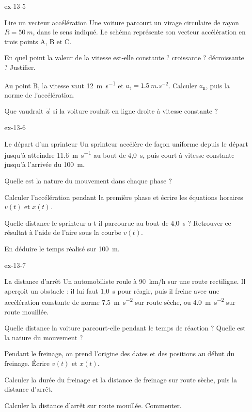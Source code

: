 \begin{blocLivre}{ex-13-5}
\begin{exercice}[1]{Lire un vecteur accélération}
Une voiture parcourt un virage circulaire de rayon $R=\qty{50}{m}$, dans le sens indiqué. Le schéma représente son
vecteur accélération en trois points A, B et C.
\begin{questions}
\item En quel point la valeur de la vitesse est-elle constante ? croissante ? décroissante ? Justifier.
\item Au point B, la vitesse vaut \qty{12}{m.s^{-1}} et $a_\mathrm{t}=\qty{1,5}{m.s^{-2}}$. Calculer $a_\mathrm{n}$, puis la norme
de l'accélération.
\item Que vaudrait $\vec{a}$ si la voiture roulait en ligne droite à vitesse constante ?
\end{questions}
\end{exercice}
\end{blocLivre}
\begin{blocLivre}{ex-13-6}
\begin{exercice}[2]{Le départ d'un sprinteur}
Un sprinteur accélère de façon uniforme depuis le départ jusqu'à atteindre \qty{11,6}{m.s^{-1}} au bout de 4,0~s, puis
court à vitesse constante jusqu'à l'arrivée du 100~m.
\begin{questions}
\item Quelle est la nature du mouvement dans chaque phase ?
\item Calculer l'accélération pendant la première phase et écrire les équations horaires $v(t)$ et $x(t)$.
\item Quelle distance le sprinteur a-t-il parcourue au bout de 4,0~s ? Retrouver ce résultat à l'aide de l'aire sous la
courbe $v(t)$.
\item En déduire le temps réalisé sur 100~m.
\end{questions}
\end{exercice}
\end{blocLivre}
\begin{blocLivre}{ex-13-7}
\begin{exercice}[2]{La distance d'arrêt}
Un automobiliste roule à 90~km/h sur une route rectiligne. Il aperçoit un obstacle : il lui faut 1,0~s pour réagir,
puis il freine avec une accélération constante de norme \qty{7,5}{m.s^{-2}} sur route sèche, ou
\qty{4,0}{m.s^{-2}} sur route mouillée.
\begin{questions}
\item Quelle distance la voiture parcourt-elle pendant le temps de réaction ? Quelle est la nature du mouvement ?
\item Pendant le freinage, on prend l'origine des dates et des positions au début du freinage. Écrire $v(t)$ et $x(t)$.
\item Calculer la durée du freinage et la distance de freinage sur route sèche, puis la distance d'arrêt.
\item Calculer la distance d'arrêt sur route mouillée. Commenter.
\end{questions}
\end{exercice}
\end{blocLivre}
